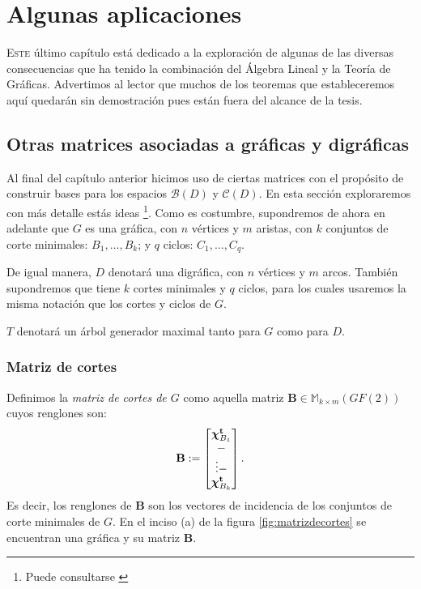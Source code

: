 \chapter{Algunas aplicaciones}

\lettrine [lines=5] {\initfamily \selectfont E} {ste} último capítulo está dedicado a la exploración de algunas de las diversas consecuencias que ha tenido la combinación del Álgebra Lineal y la Teoría de Gráficas. Advertimos al lector que muchos de los teoremas que estableceremos aquí quedarán sin demostración pues están fuera del alcance de la tesis. 


\section{Otras matrices asociadas a gráficas y digráficas}
Al final del capítulo anterior hicimos uso de ciertas matrices con el propósito de construir bases para los espacios $\mathcal{B}(D)$ y $\mathcal{C}(D)$. En esta sección exploraremos con más detalle estás ideas \footnote{Puede consultarse \cite{Deo,Seshu,Gross}}. Como es costumbre, supondremos de ahora en adelante que $G$ es una gráfica, con $n$ vértices y $m$ aristas, con $k$ conjuntos de corte minimales: $B_{1}, \ldots, B_{k}$; y $q$ ciclos: $C_{1},\ldots, C_{q}$.

De igual manera, $D$ denotará una digráfica, con $n$ vértices y $m$ arcos. También supondremos que tiene $k$ cortes minimales y $q$ ciclos, para los cuales usaremos la misma notación que los cortes y ciclos de $G$.

$T$ denotará un árbol generador maximal tanto para $G$ como para $D$.

\subsection{Matriz de cortes}
Definimos la \textit{matriz de cortes de $G$} como aquella matriz $\mathbf{B} \in \mathbb{M}_{k \times m}(GF(2))$ cuyos renglones son:
$$
\mathbf{B}:= \begin{bmatrix} 
\boldsymbol{\chi}_{B_{1}}^{\mathbf{t}} \\
\-- \\
\vdots
\-- \\
\boldsymbol{\chi}_{B_{k}}^{\mathbf{t}}
\end{bmatrix}.
$$
 Es decir, los renglones de $\mathbf{B}$ son los vectores de incidencia de los conjuntos de corte minimales de $G$. En el inciso (a) de la figura \ref{fig:matrizdecortes} se encuentran una gráfica y su matriz $\mathbf{B}$.
 

